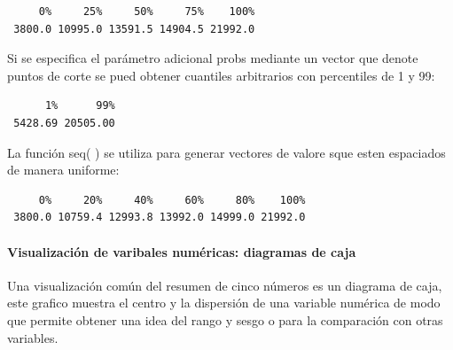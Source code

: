 \documentclass[
  letterpaper,
  DIV=11,
  numbers=noendperiod]{scrartcl}
\let\oldparagraph\paragraph
\renewcommand{\paragraph}[1]{\oldparagraph{#1}\mbox{}}
\newenvironment{Shaded}{\begin{snugshade}}{\end{snugshade}}
\newcommand{\AttributeTok}[1]{\textcolor[rgb]{0.40,0.45,0.13}{#1}}
\newcommand{\DecValTok}[1]{\textcolor[rgb]{0.68,0.00,0.00}{#1}}
\newcommand{\FloatTok}[1]{\textcolor[rgb]{0.68,0.00,0.00}{#1}}
\newcommand{\FunctionTok}[1]{\textcolor[rgb]{0.28,0.35,0.67}{#1}}
\newcommand{\NormalTok}[1]{\textcolor[rgb]{0.00,0.23,0.31}{#1}}
\newcommand{\SpecialCharTok}[1]{\textcolor[rgb]{0.37,0.37,0.37}{#1}}
\begin{document}
\begin{verbatim}
     0%     25%     50%     75%    100% 
 3800.0 10995.0 13591.5 14904.5 21992.0 
\end{verbatim}

Si se especifica el parámetro adicional probs mediante un vector que
denote puntos de corte se pued obtener cuantiles arbitrarios con
percentiles de 1 y 99:

\begin{Shaded}
\end{Shaded}

\begin{verbatim}
      1%      99% 
 5428.69 20505.00 
\end{verbatim}

La función seq( ) se utiliza para generar vectores de valore sque esten
espaciados de manera uniforme:

\begin{Shaded}
\end{Shaded}

\begin{verbatim}
     0%     20%     40%     60%     80%    100% 
 3800.0 10759.4 12993.8 13992.0 14999.0 21992.0 
\end{verbatim}

\hypertarget{visualizaciuxf3n-de-varibales-numuxe9ricas-diagramas-de-caja}{%
\paragraph{Visualización de varibales numéricas: diagramas de
caja}\label{visualizaciuxf3n-de-varibales-numuxe9ricas-diagramas-de-caja}}

Una visualización común del resumen de cinco números es un diagrama de
caja, este grafico muestra el centro y la dispersión de una variable
numérica de modo que permite obtener una idea del rango y sesgo o para
la comparación con otras variables.
\end{document}
